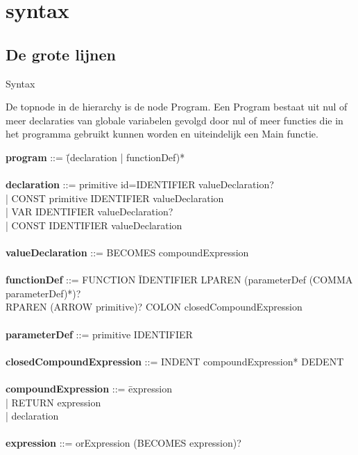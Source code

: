 \chapter{syntax}
\section{De grote lijnen}
Syntax

De topnode in de hierarchy is de node Program. Een Program bestaat uit nul of meer declaraties van globale variabelen gevolgd door nul of meer functies die in het programma gebruikt kunnen worden en uiteindelijk een Main functie.

\begin{tabbing}

{\bf program}                     ::= \=(declaration | functionDef)*\\
\\
{\bf declaration}                 ::= primitive id=IDENTIFIER valueDeclaration?\\
                                      \> | CONST primitive IDENTIFIER valueDeclaration\\
                                      \> | VAR IDENTIFIER valueDeclaration?\\
                                      \> | CONST IDENTIFIER valueDeclaration\\
\\
{\bf valueDeclaration}            ::= BECOMES compoundExpression\\
\\
{\bf functionDef}                 ::= FUNCTION \=IDENTIFIER LPAREN (parameterDef (COMMA parameterDef)*)?\\
                                      \>RPAREN (ARROW primitive)? COLON closedCompoundExpression\\
\\
{\bf parameterDef}                ::= primitive IDENTIFIER \\
\\
{\bf closedCompoundExpression}    ::= INDENT compoundExpression* DEDENT\\
\\ 
{\bf compoundExpression}          ::= \=expression\\
                                      \> | RETURN expression\\
                                      \> | declaration\\
\\ 
{\bf expression}                  ::= orExpression (BECOMES expression)?\\

\end{tabbing}
